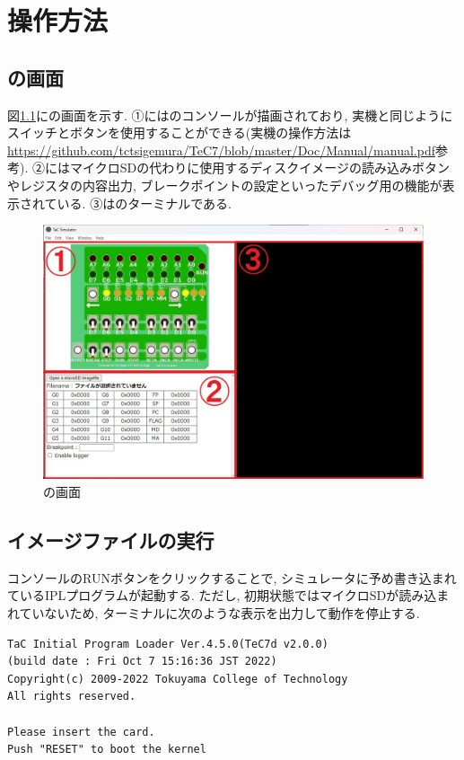 \chapter{操作方法}

\section{\tacsim の画面}

図\ref{fig:ch3-tacsim}に\tacsim の画面を示す. ①には\tac のコンソールが描画されており, 実機と同じようにスイッチとボタンを使用することができる(実機の操作方法は\url{https://github.com/tctsigemura/TeC7/blob/master/Doc/Manual/manual.pdf}参考). ②にはマイクロSDの代わりに使用するディスクイメージの読み込みボタンやレジスタの内容出力, ブレークポイントの設定といったデバッグ用の機能が表示されている. ③は\tacsim のターミナルである.

\begin{figure}[H]
    \centering
    \includegraphics[width=12cm]{"figs/chapter3-tacsimulator.jpg"}
    \caption{\tacsim の画面} \label{fig:ch3-tacsim}
\end{figure}

\section{イメージファイルの実行}

コンソールのRUNボタンをクリックすることで, シミュレータに予め書き込まれているIPLプログラムが起動する. ただし, 初期状態ではマイクロSDが読み込まれていないため, ターミナルに次のような表示を出力して動作を停止する.

\begin{mylist}
\begin{verbatim}
TaC Initial Program Loader Ver.4.5.0(TeC7d v2.0.0)
(build date : Fri Oct 7 15:16:36 JST 2022)
Copyright(c) 2009-2022 Tokuyama College of Technology
All rights reserved.

Please insert the card.
Push "RESET" to boot the kernel
\end{verbatim}
\end{mylist}

